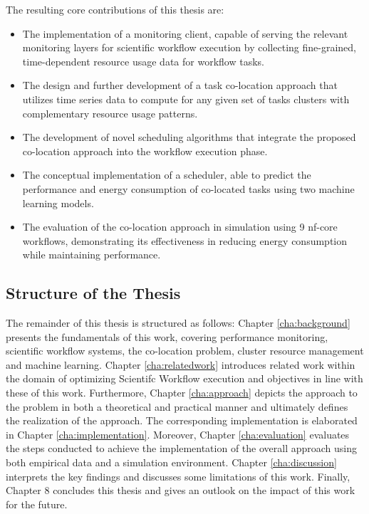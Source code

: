 The resulting core contributions of this thesis are:
\begin{itemize}
    \item The implementation of a monitoring client, capable of serving the relevant monitoring layers for scientific workflow execution by collecting fine-grained, time-dependent resource usage data for workflow tasks.
    \item The design and further development of a task co-location approach that utilizes time series data to compute for any given set of tasks clusters with complementary resource usage patterns.
    \item The development of novel scheduling algorithms that integrate the proposed co-location approach into the workflow execution phase.
    \item The conceptual implementation of a scheduler, able to predict the performance and energy consumption of co-located tasks using two machine learning models.
    \item The evaluation of the co-location approach in simulation using 9 nf-core workflows, demonstrating its effectiveness in reducing energy consumption while maintaining performance.
\end{itemize}
\subsection{Structure of the Thesis}
\label{subse:structure_of_the_thesis}
The remainder of this thesis is structured as follows: Chapter \ref{cha:background} presents the fundamentals of this work, covering performance monitoring, scientific workflow systems, the co-location problem, cluster resource management and machine learning. Chapter \ref{cha:relatedwork} introduces related work within the domain of optimizing Scientifc Workflow execution and objectives in line with these of this work. Furthermore, Chapter \ref{cha:approach} depicts the approach to the problem in both a theoretical and practical manner and ultimately defines the realization of the approach. The corresponding implementation is elaborated in Chapter \ref{cha:implementation}. Moreover, Chapter \ref{cha:evaluation} evaluates the steps conducted to achieve the implementation of the overall approach using both empirical data and a simulation environment. Chapter \ref{cha:discussion} interprets the key findings and discusses some limitations of this work. Finally, Chapter 8 concludes this thesis and gives an outlook on the impact of this work for the future.
